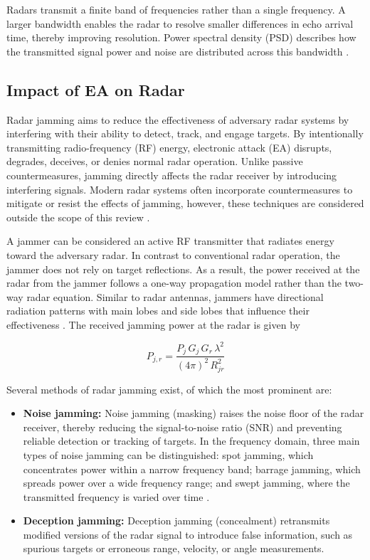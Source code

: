 Radars transmit a finite band of frequencies rather than a single frequency. A larger bandwidth enables the radar to resolve smaller differences in echo arrival time, thereby improving resolution. Power spectral density (PSD) describes how the transmitted signal power and noise are distributed across this bandwidth \cite{AFDP3_85_2023, von_spreckelsen2018_ew_forgotten, skolnik_radar_2001, mitll_radar_course}.

\subsection{Impact of EA on Radar}
\label{Impact of EA on Radar}
Radar jamming aims to reduce the effectiveness of adversary radar systems by interfering with their ability to detect, track, and engage targets. By intentionally transmitting radio-frequency (RF) energy, electronic attack (EA) disrupts, degrades, deceives, or denies normal radar operation. Unlike passive countermeasures, jamming directly affects the radar receiver by introducing interfering signals. Modern radar systems often incorporate countermeasures to mitigate or resist the effects of jamming, however, these techniques are considered outside the scope of this review \cite{RadarTutorial_Jamming, mitll_radar_course}.

A jammer can be considered an active RF transmitter that radiates energy toward the adversary radar. In contrast to conventional radar operation, the jammer does not rely on target reflections. As a result, the power received at the radar from the jammer follows a one-way propagation model rather than the two-way radar equation. Similar to radar antennas, jammers have directional radiation patterns with main lobes and side lobes that influence their effectiveness \cite{Adamy2001EW101, EW_Radar_Handbook, RadarTutorial_Jamming, mitll_radar_course}. The received jamming power at the radar is given by

\begin{equation}
P_{j,r} = \frac{P_j \, G_j \, G_r \, \lambda^2}
{(4\pi)^2 \, R_{jr}^2}
\end{equation}
\label{jamming_power}

Several methods of radar jamming exist, of which the most prominent are:
\begin{itemize}
    \item \textbf{Noise jamming:} Noise jamming (masking) raises the noise floor of the radar receiver, thereby reducing the signal-to-noise ratio (SNR) and preventing reliable detection or tracking of targets. In the frequency domain, three main types of noise jamming can be distinguished: spot jamming, which concentrates power within a narrow frequency band; barrage jamming, which spreads power over a wide frequency range; and swept jamming, where the transmitted frequency is varied over time \cite{RadarTutorial_Jamming}.
    \item \textbf{Deception jamming:} Deception jamming (concealment) retransmits modified versions of the radar signal to introduce false information, such as spurious targets or erroneous range, velocity, or angle measurements.
\end{itemize}

